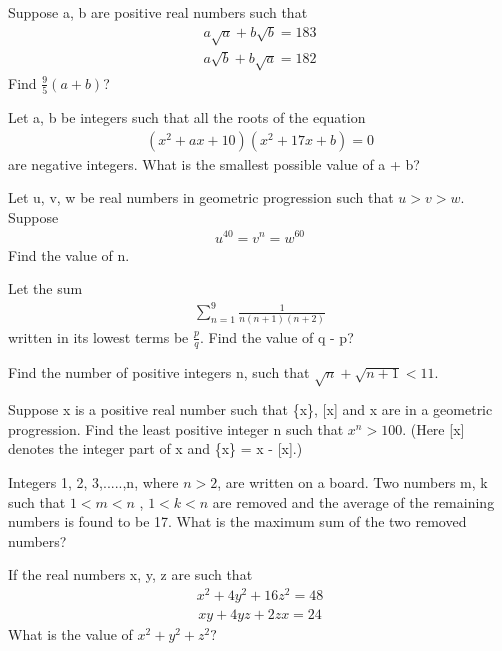 \item Suppose a, b are positive real numbers such that
\begin{align*} 
a\sqrt{a} + b\sqrt{b} = 183
\end{align*}
\begin{align*} 
a\sqrt{b} + b\sqrt{a} = 182
\end{align*} 
Find $\frac{9}{5}(a + b)$?

\item Let a, b be integers such that all the roots of the equation 
\begin{align}
(x^{2} + ax + 10)(x^{2} + 17x + b) = 0
\end{align}
are negative integers. What is the smallest possible value of a + b?

\item  Let u, v, w be real numbers in geometric progression such that $u > v > w$. Suppose 
\begin{align*}
u^{40} = v^{n} = w^{60}
\end{align*}
Find the value of n.

\item Let the sum 
\begin{align*}
\sum_{n=1}^{9} \frac{1}{n(n + 1)(n + 2)}
\end{align*} 
written in its lowest terms be $\frac{p}{q}$. Find the value of q - p?

\item Find the number of positive integers n, such that $\sqrt{n} + \sqrt{n + 1} < 11$.

\item Suppose x is a positive real number such that \{x\}, [x] and x are in a geometric progression. Find the least positive integer n such that $x^{n} > 100$. (Here [x] denotes the integer part of x and \{x\} = x - [x].) 

\item Integers 1, 2, 3,.....,n, where $n > 2$, are written on a board. Two numbers m, k such that $1 < m < n$ , 
$1 < k < n$ are removed and the average of the remaining numbers is found to be 17. What is the maximum sum of the two removed numbers?

\item If the real numbers x, y, z are such that 
\begin{align}
x^2 + 4y^2 + 16z^2 = 48
\end{align}
\begin{align} 
xy + 4yz + 2zx = 24
\end{align}
What is the value of $x^2 + y^2 + z^2 ?$

